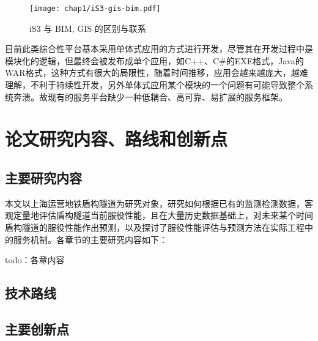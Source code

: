 \begin{figure}[!h]
	\centering
	\texttt{[image: chap1/iS3-gis-bim.pdf]}
	\caption{iS3 与 BIM, GIS 的区别与联系}
	\label{fig:iS3-gis-bim}
\end{figure}

目前此类综合性平台基本采用单体式应用的方式进行开发，尽管其在开发过程中是模块化的逻辑，但最终会被发布成单个应用，如C++、C\#的EXE格式，Java的WAR格式，这种方式有很大的局限性，随着时间推移，应用会越来越庞大，越难理解，不利于持续性开发，另外单体式应用某个模块的一个问题有可能导致整个系统奔溃。故现有的服务平台缺少一种低耦合、高可靠、易扩展的服务框架。

\section{论文研究内容、路线和创新点}

\subsection{主要研究内容}

本文以上海运营地铁盾构隧道为研究对象，研究如何根据已有的监测检测数据，客观定量地评估盾构隧道当前服役性能，且在大量历史数据基础上，对未来某个时间盾构隧道的服役性能作出预测，以及探讨了服役性能评估与预测方法在实际工程中的服务机制。各章节的主要研究内容如下：

todo：各章内容

\subsection{技术路线}

\subsection{主要创新点}